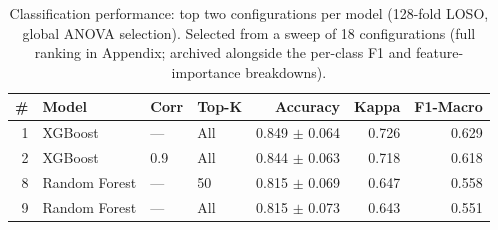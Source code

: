 \begin{table}[htbp]
\centering
\caption[Classification performance: best two configurations per model]{Classification
performance: top two configurations per model (128-fold LOSO, global ANOVA
selection). Selected from a sweep of 18 configurations (full ranking
in Appendix; archived alongside the per-class F1 and feature-importance
breakdowns).}
\label{tab:performance_18configs}
\begin{tabular}{rlllrrr}
\toprule
\# & Model & Corr & Top-K & Accuracy & Kappa & F1-Macro \\
\midrule
1 & XGBoost       & ---  & All & 0.849 $\pm$ 0.064 & 0.726 & 0.629 \\
2 & XGBoost       & 0.9  & All & 0.844 $\pm$ 0.063 & 0.718 & 0.618 \\
\midrule
8 & Random Forest & ---  &  50 & 0.815 $\pm$ 0.069 & 0.647 & 0.558 \\
9 & Random Forest & ---  & All & 0.815 $\pm$ 0.073 & 0.643 & 0.551 \\
\bottomrule
\end{tabular}
\end{table}
